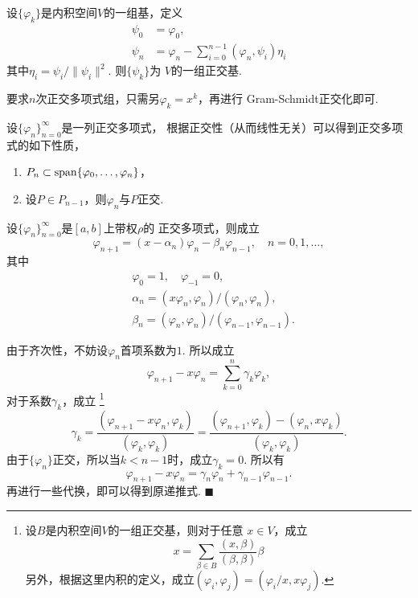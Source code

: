   \begin{alg}
    设$\{\varphi_k\}$是内积空间$V$的一组基，定义
    \[\begin{split}
      \psi_0 &= \varphi_0, \\
      \psi_{n} &= \varphi_n - \sum_{i=0}^{n-1}(\varphi_n, \psi_i)\eta_i
    \end{split}\]
    其中$\eta_i = \psi_i / \|\psi_i\|^2$. 则$\{\psi_k\}$为
    $V$的一组正交基.
  \end{alg}
  \remark
    要求$n$次正交多项式组，只需另$\varphi_k = x^k$，再进行
    Gram-Schmidt正交化即可.

  \begin{thm}
    设$\{\varphi_n\}_{n=0}^\infty$是一列正交多项式，
    根据正交性（从而线性无关）可以得到正交多项式的如下性质，
    \begin{enumerate}
      \item $P_n \subset \operatorname{span}\{\varphi_0, \dots,\varphi_n\}$，
      \item 设$P\in P_{n-1}$，则$\varphi_n$与$P$正交.
    \end{enumerate}
  \end{thm}

  \begin{thm}
    设$\{\varphi_n\}_{n=0}^\infty$是$[a,b]$上带权$\rho$的
    正交多项式，则成立
    \[
      \varphi_{n+1} = (x-\alpha_n)\varphi_n - \beta_n\varphi_{n-1},
      \quad n = 0, 1,\dots,
    \]
    其中
    \[\begin{split}
      &\varphi_0 = 1,\quad \varphi_{-1} = 0,\\
      &\alpha_n = (x\varphi_n, \varphi_n) / (\varphi_n, \varphi_n),\\
      &\beta_n = (\varphi_n, \varphi_n) / (\varphi_{n-1}, \varphi_{n-1}).
    \end{split}\]
  \end{thm}
  \proof
    由于齐次性，不妨设$\varphi_n$首项系数为$1$. 所以成立
    \[
      \varphi_{n+1}-x\varphi_n = \sum_{k=0}^n\gamma_k\varphi_k,
    \]
    对于系数$\gamma_k$，成立
    \footnote{
      设$B$是内积空间$V$的一组正交基，则对于任意
      $x\in V$，成立
      \[
        x = \sum_{\beta\in B}\frac{(x,\beta)}{(\beta,\beta)}\beta
      \]
      另外，根据这里内积的定义，成立$(\varphi_i,\varphi_j)
      =(\varphi_i/x, x\varphi_j)$.
    }
    \[
      \gamma_k = \frac{(\varphi_{n+1}-x\varphi_n,\varphi_k)}
      {(\varphi_k, \varphi_k)}
      = \frac{(\varphi_{n+1},\varphi_k) - (\varphi_n, x\varphi_k)}{(\varphi_k,\varphi_k)}.
    \]
    由于$\{\varphi_n\}$正交，所以当$k<n-1$时，成立$\gamma_k=0$.
    所以有
    \[
      \varphi_{n+1} - x\varphi_n = \gamma_n\varphi_n + \gamma_{n-1}\varphi_{n-1}.
    \]
    再进行一些代换，即可以得到原递推式. $\blacksquare$

